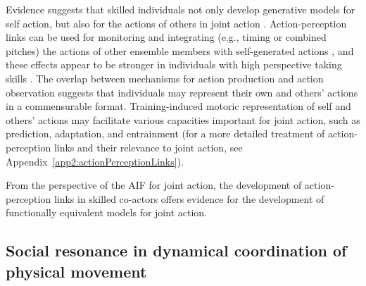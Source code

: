 \begin{CJK}{UTF8}{gbsn}
Evidence suggests that skilled individuals not only develop generative models for self action, but also for the actions of others in joint action \citep{Novembre2012}. Action-perception links can be used for monitoring and integrating (e.g., timing or combined pitches) the actions of other ensemble members with self-generated actions \citep{Loehr2013}, and these effects appear to be stronger in individuals with high perspective taking skills \citep{Novembre2012,Loehr2013}.  The overlap between mechanisms for action production and action observation suggests that individuals may represent their own and others’ actions in a commensurable format.  Training-induced motoric representation of self and others' actions may facilitate various capacities important for joint action, such as prediction, adaptation, and entrainment (for a more detailed treatment of action-perception links and their relevance to joint action, see Appendix~\ref{app2:actionPerceptionLinks}).

From the perspective of the AIF for joint action, the development of action-perception links in skilled co-actors offers evidence for the development of functionally equivalent models for joint action.


































\subsection{Social resonance in dynamical coordination of physical movement}


\end{CJK}
